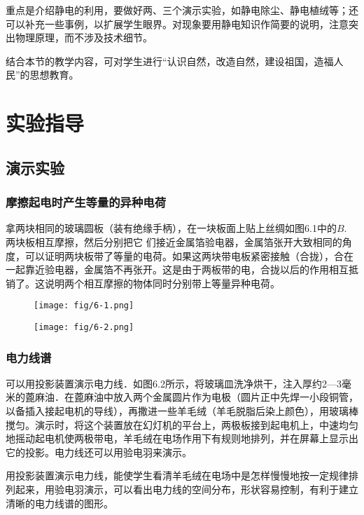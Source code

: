 重点是介绍静电的利用，要做好两、三个演示实验，如静电除尘、静电植绒等；还可以补充一些事例，以扩展学生眼界。对现象要用静电知识作简要的说明，注意突出物理原理，而不涉及技术细节。

结合本节的教学内容，可对学生进行“认识自然，改造自然，建设祖国，造福人民”的思想教育。

\section{实验指导}
\subsection{演示实验}
\subsubsection{摩擦起电时产生等量的异种电荷}

拿两块相同的玻璃圆板（装有绝缘手柄），在一块板面上贴上丝绸如图6.1中的$B$. 两块板相互摩擦，然后分别把它
们接近金属箔验电器，金属箔张开大致相同的角度，可以证明两块板带了等量的电荷。如果这两块带电板紧密接触（合拢），合在一起靠近验电器，金属箔不再张开。这是由于两板带的电，合拢以后的作用相互抵销了。这说明两个相互摩擦的物体同时分别带上等量异种电荷。
\begin{figure}[htp]\centering
    \begin{minipage}[t]{0.48\textwidth}
    \centering
    \texttt{[image: fig/6-1.png]}
    \caption{}
    \end{minipage}
    \begin{minipage}[t]{0.48\textwidth}
    \centering
    \texttt{[image: fig/6-2.png]}
    \caption{}
    \end{minipage}
    \end{figure}


\subsubsection{电力线谱}

可以用投影装置演示电力线．如图6.2所示，将玻璃皿洗净烘干，注入厚约2—3毫米的蓖麻油．在蓖麻油中放入两个金属圆片作为电极（圆片正中先焊一小段铜管，以备插入接起电机的导线），再撒进一些羊毛绒（羊毛脱脂后染上颜色），用玻璃棒搅匀。演示时，将这个装置放在幻灯机的平台上，两极板接到起电机上，中速均匀地摇动起电机使两极带电，羊毛绒在电场作用下有规则地排列，并在屏幕上显示出它的投影。电力线还可以用验电羽来演示。

用投影装置演示电力线，能使学生看清羊毛绒在电场中是怎样慢慢地按一定规律排列起来，用验电羽演示，可以看出电力线的空间分布，形状容易控制，有利于建立清晰的电力线谱的图形。

